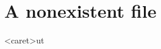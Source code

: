\documentclass[11pt]{article}
\begin{document}
    \section{A nonexistent file}
    \inp<caret>ut{}
\end{document}
